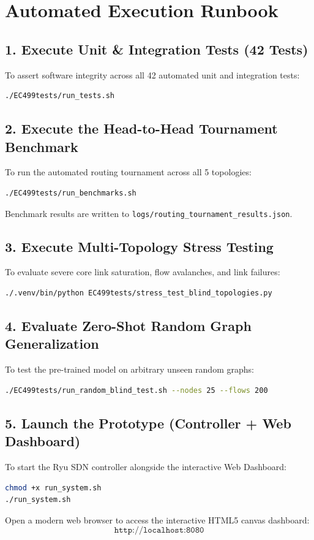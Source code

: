 \documentclass[12pt,a4paper,oneside]{report}
\begin{document}
\section{Automated Execution Runbook}

\subsection{1. Execute Unit \& Integration Tests (42 Tests)}
To assert software integrity across all 42 automated unit and integration tests:
\begin{lstlisting}[language=bash]
./EC499tests/run_tests.sh
\end{lstlisting}

\subsection{2. Execute the Head-to-Head Tournament Benchmark}
To run the automated routing tournament across all 5 topologies:
\begin{lstlisting}[language=bash]
./EC499tests/run_benchmarks.sh
\end{lstlisting}
Benchmark results are written to \texttt{logs/routing\_tournament\_results.json}.

\subsection{3. Execute Multi-Topology Stress Testing}
To evaluate severe core link saturation, flow avalanches, and link failures:
\begin{lstlisting}[language=bash]
./.venv/bin/python EC499tests/stress_test_blind_topologies.py
\end{lstlisting}

\subsection{4. Evaluate Zero-Shot Random Graph Generalization}
To test the pre-trained model on arbitrary unseen random graphs:
\begin{lstlisting}[language=bash]
./EC499tests/run_random_blind_test.sh --nodes 25 --flows 200
\end{lstlisting}

\subsection{5. Launch the Prototype (Controller + Web Dashboard)}
To start the Ryu SDN controller alongside the interactive Web Dashboard:
\begin{lstlisting}[language=bash]
chmod +x run_system.sh
./run_system.sh
\end{lstlisting}
Open a modern web browser to access the interactive HTML5 canvas dashboard:
\begin{equation*}
    \texttt{http://localhost:8080}
\end{equation*}
\end{document}
